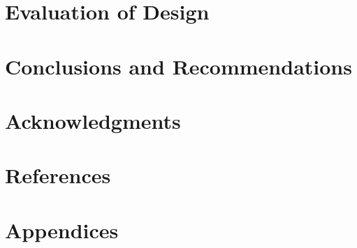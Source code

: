 \documentclass{article}
\begin{document}
\section{Evaluation of Design}
\newpage

\section{Conclusions and Recommendations}
\newpage

\section{Acknowledgments}
\newpage

\section{References}
\newpage

\section{Appendices}
\newpage
\end{document}
